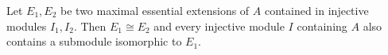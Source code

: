 Let $E_1, E_2$ be two maximal essential extensions of $A$ contained in injective modules $I_1, I_2$. Then $E_1 \cong E_2$ and every injective module $I$ containing $A$ also contains a submodule isomorphic to $E_1$.
